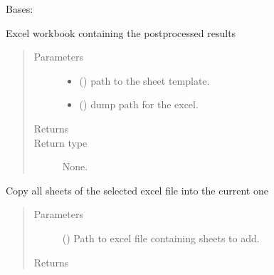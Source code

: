 \documentclass[letterpaper,10pt,english]{sphinxmanual}
\begin{document}
\begin{fulllineitems}
\label{\detokenize{api/postprocessing:output.ExcelOutputSheet}}
Bases: 

Excel workbook containing the post\sphinxhyphen{}processed results
\begin{quote}\begin{description}
\item[{Parameters}] \leavevmode\begin{itemize}
\item {} 
 () \textendash{} path to the sheet template.

\item {} 
 () \textendash{} dump path for the excel.

\end{itemize}

\item[{Returns}] \leavevmode


\item[{Return type}] \leavevmode
None.

\end{description}\end{quote}

\begin{fulllineitems}
\label{\detokenize{api/postprocessing:output.ExcelOutputSheet.copy_sheets}}
Copy all sheets of the selected excel file into the current one
\begin{quote}\begin{description}
\item[{Parameters}] \leavevmode
{} () \textendash{} Path to excel file containing sheets to add.

\item[{Returns}] \leavevmode



\end{description}
\end{quote}
\end{fulllineitems}
\end{fulllineitems}
\end{document}
